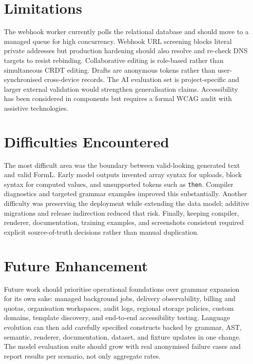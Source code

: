 \documentclass[12pt,a4paper,oneside]{report}
\begin{document}
\section{Limitations}
The webhook worker currently polls the relational database and should move to a managed queue
for high concurrency. Webhook URL screening blocks literal private addresses but production
hardening should also resolve and re-check DNS targets to resist rebinding. Collaborative
editing is role-based rather than simultaneous CRDT editing. Drafts are anonymous tokens rather
than user-synchronised cross-device records. The AI evaluation set is project-specific and
larger external validation would strengthen generalisation claims. Accessibility has been
considered in components but requires a formal WCAG audit with assistive technologies.

\section{Difficulties Encountered}
The most difficult area was the boundary between valid-looking generated text and valid FormL.
Early model outputs invented array syntax for uploads, block syntax for computed values, and
unsupported tokens such as \texttt{then}. Compiler diagnostics and targeted grammar examples
improved this substantially. Another difficulty was preserving the deployment while extending
the data model; additive migrations and release indirection reduced that risk. Finally, keeping
compiler, renderer, documentation, training examples, and screenshots consistent required
explicit source-of-truth decisions rather than manual duplication.

\section{Future Enhancement}
Future work should prioritise operational foundations over grammar expansion for its own sake:
managed background jobs, delivery observability, billing and quotas, organisation workspaces,
audit logs, regional storage policies, custom domains, template discovery, and end-to-end
accessibility testing. Language evolution can then add carefully specified constructs backed by
grammar, AST, semantic, renderer, documentation, dataset, and fixture updates in one change.
The model evaluation suite should grow with real anonymised failure cases and report results per
scenario, not only aggregate rates.

\end{document}
